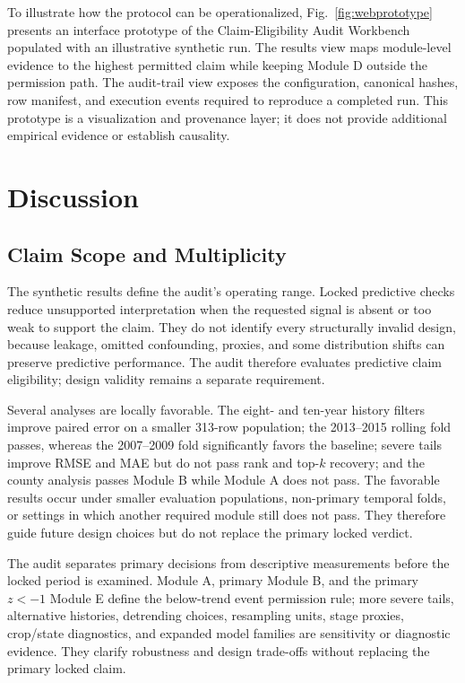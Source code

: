 \documentclass[conference]{IEEEtran}
\begin{document}
To illustrate how the protocol can be operationalized, Fig.~\ref{fig:webprototype}
presents an interface prototype of the Claim-Eligibility Audit Workbench
populated with an illustrative synthetic run. The results view maps module-level
evidence to the highest permitted claim while keeping Module D outside the
permission path. The audit-trail view exposes the configuration, canonical
hashes, row manifest, and execution events required to reproduce a completed
run. This prototype is a visualization and provenance layer; it does not provide
additional empirical evidence or establish causality.

\section{Discussion}
\subsection{Claim Scope and Multiplicity}
The synthetic results define the audit's operating range. Locked predictive
checks reduce unsupported interpretation when the requested signal is absent or
too weak to support the claim. They do not identify every structurally invalid
design, because leakage, omitted confounding, proxies, and some distribution
shifts can preserve predictive performance. The audit therefore evaluates
predictive claim eligibility; design validity remains a separate requirement.

Several analyses are locally favorable. The eight- and ten-year history filters
improve paired error on a smaller 313-row population; the 2013--2015 rolling fold
passes, whereas the 2007--2009 fold significantly favors the baseline; severe
tails improve RMSE and MAE but do not pass rank and top-$k$ recovery; and the county
analysis passes Module B while Module A does not pass. The favorable results
occur under smaller evaluation populations, non-primary temporal folds, or
settings in which another required module still does not pass. They therefore
guide future design choices but do not replace the primary locked verdict.

The audit separates primary decisions from descriptive measurements before the
locked period is examined. Module A, primary Module B, and the primary $z<-1$
Module E define the below-trend event permission rule; more severe tails,
alternative histories, detrending choices, resampling units, stage proxies,
crop/state diagnostics, and expanded model families are sensitivity or diagnostic
evidence. They clarify robustness and design trade-offs without replacing the
primary locked claim.
\end{document}
